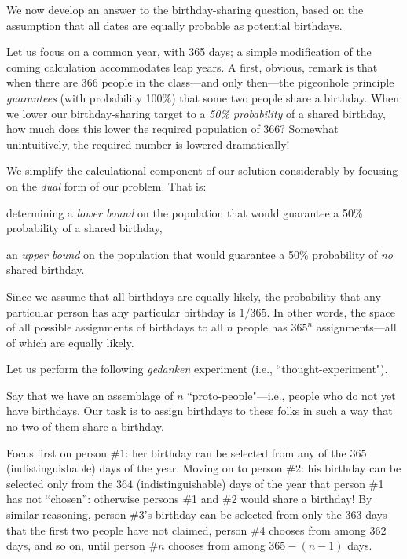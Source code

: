 \noindent
We now develop an answer to the birthday-sharing question, based on the assumption
that all dates are equally probable as potential birthdays.

\bigskip

Let us focus on a common year, with 365 days; a simple modification of the coming calculation 
accommodates leap years.  A first, obvious, remark is that when there are 366 people in the 
class---and only then---the pigeonhole principle {\em guarantees} (with probability 100\%) 
that some two people share a birthday.  When we lower our birthday-sharing target to a 
{\em 50\% probability} of a shared birthday, how much does this lower the required population 
of 366?  Somewhat unintuitively, the required number is lowered dramatically!

\bigskip

We simplify the calculational component of our solution considerably by focusing on the 
{\em dual} form of our problem.  That is:

\smallskip

 determining a {\em lower bound} on the population
that would guarantee a 50\% probability of a shared birthday,

 an {\em upper bound} on the population that would
guarantee a 50\% probability of {\em no} shared birthday.

\medskip

Since we assume that all birthdays are equally likely, the probability
that any particular person has any particular birthday is $1/365$.  In
other words, the space of all possible assignments of birthdays to all
$n$ people has $365^n$ assignments---all of which are equally likely.

Let us perform the following {\em gedanken} experiment (i.e., ``thought-experiment").

\smallskip

Say that we have an assemblage of $n$ ``proto-people"---i.e., people who do not yet have  birthdays.
Our task is to assign birthdays to these folks in such a way that no two of them share a birthday.

Focus first on person \#1: her birthday can be selected from any of
the $365$ (indistinguishable) days of the year.  Moving on to person
\#2: his birthday can be selected only from the $364$
(indistinguishable) days of the year that person \#1 has not
``chosen'': otherwise persons \#1 and \#2 would share a birthday!  By
similar reasoning, person \#3's birthday can be selected from only the
$363$ days that the first two people have not claimed, person \#4
chooses from among $362$ days, and so on, until person \#$n$ chooses
from among $365-(n-1)$ days.

